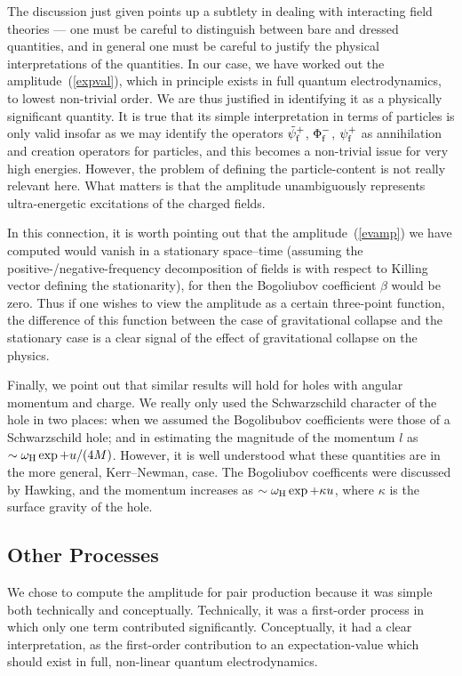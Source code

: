 \documentclass[11pt]{article}
\begin{document}
The discussion just given points up a subtlety in dealing with
interacting field theories --- one must be careful to distinguish between bare
and dressed quantities, and in general one must be careful to justify the
physical interpretations of the quantities.  In our case, we have worked out the
amplitude~(\ref{expval}), which in principle exists in full quantum
electrodynamics, to lowest non-trivial order.  We are thus justified in
identifying it as a physically significant quantity.  It is true that its
simple
interpretation in terms of particles is only valid insofar as we may identify
the operators ${\tilde\psi}^+_{\rm f}$, $\Phi ^-_{\rm f}$, $\psi ^+_{\rm f}$ as
annihilation and creation operators for particles, and this becomes a
non-trivial issue for very high energies.  However, the problem of defining
the particle-content is not really relevant here.  What matters is that the
amplitude unambiguously represents ultra-energetic excitations of the
charged fields.

In this connection, it is worth pointing out that the amplitude~(\ref{evamp})
we have computed would vanish in a stationary space--time (assuming the
positive-/negative-frequency decomposition of fields is with respect to Killing
vector defining the stationarity), for then the Bogoliubov coefficient $\beta$
would be zero.  Thus if one wishes to view the amplitude as a certain
three-point function, the difference of this function between the case of
gravitational collapse and the stationary case is a clear signal of the effect
of gravitational collapse on the physics.

Finally, we point out that similar results will hold for holes with angular
momentum and charge.  We really only used the Schwarzschild character of the
hole in two places:  when we assumed the Bogolibubov coefficients were those of
a Schwarzschild hole; and in estimating the magnitude of the momentum $l$ as
$\sim\omega _{\rm H}\exp +u/(4M)$.  However, it is well understood what these
quantities are in the more general, Kerr--Newman, case.  The Bogoliubov
coefficents were discussed by Hawking, and the momentum increases as $\sim
\omega _{\rm H}\exp +\kappa u$, where $\kappa$ is the surface gravity of the
hole.

\subsection{Other Processes}

We chose to compute the amplitude for pair production because it was simple both
technically and conceptually.  Technically, it was a first-order process in
which only one term contributed significantly.  Conceptually, it had a clear
interpretation, as the first-order contribution to an expectation-value which
should exist in full, non-linear quantum electrodynamics.
\end{document}
